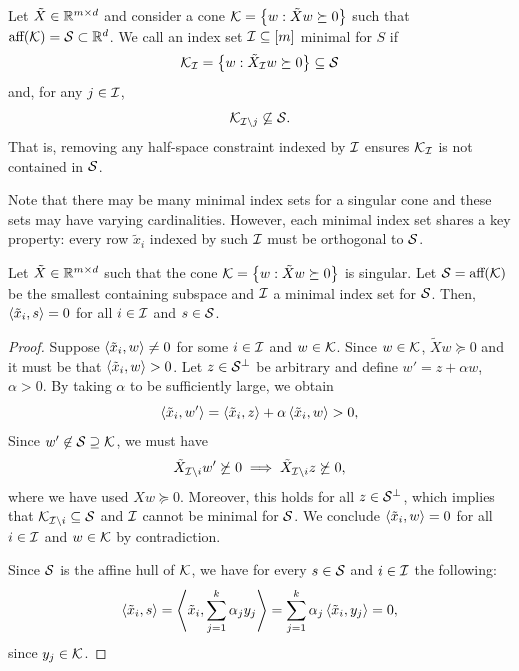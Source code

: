 \begin{definition}\label{def:minimal-constraints}
    Let \( \tilde X \in \mathbb{R}^{m \times d} \) and consider a cone
    \( \mathcal{K} = \left\{ w: \tilde X w \succeq 0\right\} \)
    such that \( \text{aff} (\mathcal{K}) = \mathcal{S} \subset \mathbb{R}^d \).
    We call an index set \( \mathcal{I} \subseteq [m] \) minimal for \( S \) if
    \[ \mathcal{K}_{\mathcal{I}} = \left\{w : \tilde X_{\mathcal{I}} w \succeq 0\right\} \subseteq \mathcal{S} \]
    and, for any \( j \in \mathcal{I} \),
    \[
        \mathcal{K}_{\mathcal{I} \setminus j} \not \subseteq \mathcal{S}.
    \]
    That is, removing any half-space constraint indexed by \( \mathcal{I} \) ensures \( \mathcal{K}_{\mathcal{I}} \) is not contained in \( \mathcal{S} \).
\end{definition}

Note that there may be many minimal index sets for a singular cone and these sets may have varying cardinalities.
However, each minimal index set shares a key property: every row \( \tilde x_i \) indexed by such \( \mathcal{I} \) must be orthogonal to \( \mathcal{S} \).

\begin{lemma}\label{lemma:orthogonality}
    Let \( \tilde X \in \mathbb{R}^{m \times d} \) such that the cone
    \( \mathcal{K} = \left\{ w: \tilde X w \succeq 0\right\} \)
    is singular.
    Let \( \mathcal{S} = \text{aff} (\mathcal{K}) \) be the smallest containing subspace and \( \mathcal{I} \) a minimal index set for \( \mathcal{S} \).
    Then, \( \left\langle\tilde x_i, s\right\rangle = 0 \) for all \( i \in \mathcal{I} \) and \( s \in \mathcal{S} \).
\end{lemma}
\begin{proof}
    Suppose \( \left\langle\tilde x_i, w\right\rangle \neq 0 \) for some \( i \in \mathcal{I} \) and \( w \in \mathcal{K} \).
    Since \( w \in \mathcal{K} \), \( \tilde X w \succeq 0 \) and it must be that \( \left\langle\tilde x_i, w\right\rangle > 0 \).
    Let \( z \in \mathcal{S}^{\perp} \) be arbitrary and define \( w' = z + \alpha w \), \( \alpha > 0 \).
    By taking \( \alpha \) to be sufficiently large, we obtain
    \[
        \left\langle\tilde x_i, w'\right\rangle = \left\langle\tilde x_i, z\right\rangle  + \alpha \left\langle\tilde x_i, w\right\rangle > 0,
    \]
    Since \( w' \not \in \mathcal{S} \supseteq \mathcal{K} \), we must have
    \[ \tilde X_{\mathcal{I} \setminus i} w' \not \succeq 0 \implies \tilde X_{\mathcal{I} \setminus i} z \not \succeq 0, \]
    where we have used \( X w \succeq 0 \).
    Moreover, this holds for all \( z \in \mathcal{S}^{\perp} \), which implies that \( \mathcal{K}_{\mathcal{I} \setminus i} \subseteq \mathcal{S} \) and \( \mathcal{I} \) cannot be minimal for \( \mathcal{S} \).
    We conclude \( \left\langle\tilde x_i, w\right\rangle = 0 \) for all \( i \in \mathcal{I} \) and \( w \in \mathcal{K} \) by contradiction.

    Since \( \mathcal{S} \) is the affine hull of \( \mathcal{K} \), we have for every \( s \in \mathcal{S} \) and \( i \in \mathcal{I} \) the following:
    \[
        \left\langle\tilde x_i, s\right\rangle = \left\langle\tilde x_i, \sum_{j=1}^k \alpha_j y_j\right\rangle = \sum_{j=1}^k \alpha_j \left\langle \tilde x_i, y_j\right\rangle = 0,
    \]
    since \( y_j \in \mathcal{K} \).
\end{proof}


